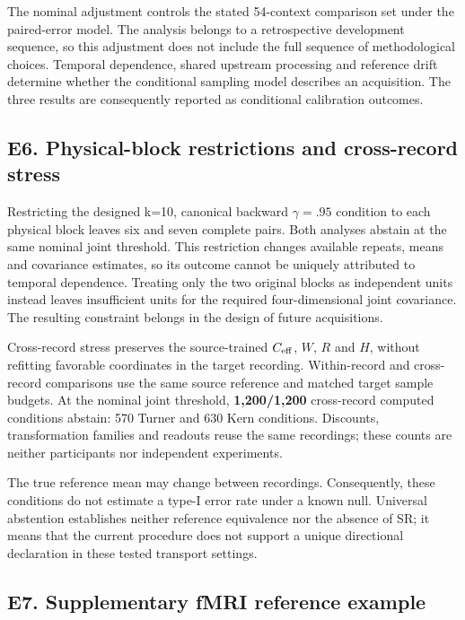 \documentclass[11pt,a4paper]{article}
\begin{document}
The nominal adjustment controls the stated 54-context comparison set
under the paired-error model. The analysis belongs to a retrospective
development sequence, so this adjustment does not include the full
sequence of methodological choices. Temporal dependence, shared upstream
processing and reference drift determine whether the conditional
sampling model describes an acquisition. The three results are
consequently reported as conditional calibration outcomes.

\subsection{E6. Physical-block restrictions and cross-record
stress}\label{e6.-physical-block-restrictions-and-cross-record-stress}

Restricting the designed k=10, canonical backward \(\gamma=.95\)
condition to each physical block leaves six and seven complete pairs.
Both analyses abstain at the same nominal joint threshold. This
restriction changes available repeats, means and covariance estimates,
so its outcome cannot be uniquely attributed to temporal dependence.
Treating only the two original blocks as independent units instead
leaves insufficient units for the required four-dimensional joint
covariance. The resulting constraint belongs in the design of future
acquisitions.

Cross-record stress preserves the source-trained \(C_{\rm eff}\), \(W\),
\(R\) and \(H\), without refitting favorable coordinates in the target
recording. Within-record and cross-record comparisons use the same
source reference and matched target sample budgets. At the nominal joint
threshold, \textbf{1,200/1,200} cross-record computed conditions
abstain: 570 Turner and 630 Kern conditions. Discounts, transformation
families and readouts reuse the same recordings; these counts are
neither participants nor independent experiments.

The true reference mean may change between recordings. Consequently,
these conditions do not estimate a type-I error rate under a known null.
Universal abstention establishes neither reference equivalence nor the
absence of SR; it means that the current procedure does not support a
unique directional declaration in these tested transport settings.

\subsection{E7. Supplementary fMRI reference
example}\label{e7.-supplementary-fmri-reference-example}
\end{document}
